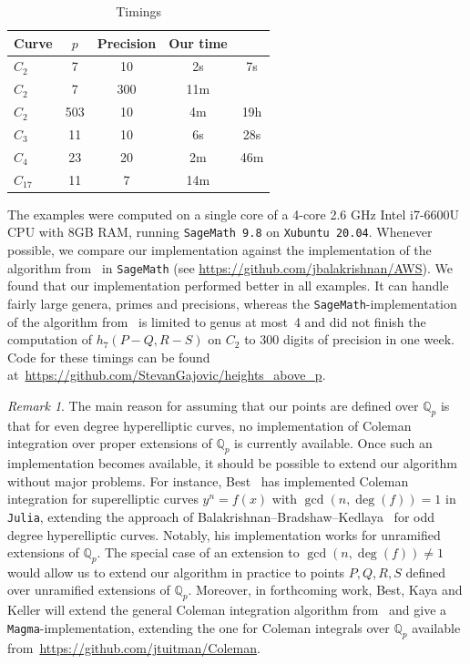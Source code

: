 \documentclass[11pt, a4paper]{amsart}
\newcommand{\Q}{\mathbb{Q}}
\theoremstyle{remark}
\newtheorem{remark}[theorem]{Remark}
\numberwithin{equation}{section}
\begin{document}
\begin{table}[t]
\begin{tabular}{| l | c | c | c | c | }
\hline
  Curve & $p$ & Precision & Our time & \cite{BBHeights} \\
\hline 
$C_2$ & 7 & 10 & 2s & 7s  \\ 
$C_2$ & 7 & 300 & 11m &  \\ 
$C_2$ & 503 & 10 & 4m & 19h \\ 
$C_3$ & 11 & 10 & 6s & 28s \\
$C_4$ & 23 & 20 & 2m & 46m \\
$C_{17}$ & 11 & 7 & 14m & \\ \hline
\end{tabular}
  \caption{Timings}\label{tab:timings}
\end{table}
The examples were computed on a single core of a 4-core 2.6 GHz Intel
i7-6600U CPU with 8GB RAM, running {\tt SageMath~9.8} on {\tt  Xubuntu 20.04}.
Whenever possible, we compare our
implementation against the implementation of 
the algorithm 
from~\cite{BBHeights} in \texttt{SageMath} (see
  \url{https://github.com/jbalakrishnan/AWS}).
We found that our implementation performed better in all examples. 
It can handle fairly large genera, primes and
precisions, whereas the \texttt{SageMath}-implementation  
of the algorithm from~\cite{BBHeights} is limited to genus at most~4 and
did not finish the computation of $h_{7}(P-Q,R-S)$ on $C_2$ to $300$ digits
of precision in one week.
Code for these timings can be found at~{\url{https://github.com/StevanGajovic/heights_above_p}}. 



\begin{remark}\label{R:extensions}
  The main reason for assuming that our points are defined over $\Q_p$ is
  that for even degree hyperelliptic curves, no implementation of Coleman
  integration over proper extensions of $\Q_p$ is currently available. Once such
  an implementation becomes available, it should be possible to extend 
  our algorithm without major problems.
    For instance, Best~\cite{Alex-ColemanIntegration-Unramified-Superelliptic} has implemented Coleman integration for superelliptic
    curves $y^n=f(x)$ with $\gcd(n,\deg(f))=1$ in {\tt Julia}, extending the approach of
    Balakrishnan--Bradshaw--Kedlaya~\cite{BBK} for odd degree hyperelliptic curves. Notably, his implementation
    works for unramified extensions of $\Q_p$. The special case of an extension to
    $\gcd(n,\deg(f))\ne 1$ would allow us to extend our algorithm in practice to points
    $P,Q,R,S$ defined over unramified extensions of $\Q_p$.
    Moreover, in forthcoming work, Best, Kaya and Keller will extend the general
    Coleman integration algorithm from~\cite{BalakrishnanTuitman} and give
    a {\tt Magma}-implementation, extending the one
for Coleman integrals over $\Q_p$ available 
    from~{\url{https://github.com/jtuitman/Coleman}}.
\end{remark}
\end{document}
